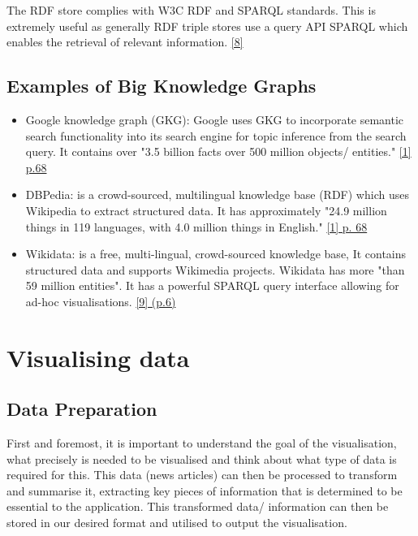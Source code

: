 
The RDF store complies with  W3C RDF and SPARQL standards. This is extremely useful as generally RDF triple stores use a query API SPARQL which enables the retrieval of relevant information. \hyperlink{8}{[8]}

\subsection{Examples of Big Knowledge Graphs}

\begin{itemize}
\item Google knowledge graph (GKG):  Google uses GKG to incorporate semantic search functionality into its search engine for topic inference from the search query. It contains over "3.5
billion facts over 500 million objects/ entities." \hyperlink{1}{[1] p.68}

\item DBPedia: is a crowd-sourced, multilingual knowledge base (RDF) which uses Wikipedia to extract structured data. It has approximately "24.9 million things in 119 languages, with 4.0 million things in English." \hyperlink{1}{[1] p. 68}

\item Wikidata: is a free, multi-lingual, crowd-sourced
knowledge base, It contains structured data and supports Wikimedia projects. Wikidata has more "than 59 million entities". It has a powerful SPARQL query interface allowing for ad-hoc visualisations. \hyperlink{9}{[9] (p.6)}

\end{itemize}


\section{Visualising data}



\subsection{Data Preparation}
First and foremost, it is important to understand the goal of the visualisation, what precisely is needed to be visualised and think about what type of data is required for this. This data (news articles) can then be processed to transform and summarise it, extracting key pieces of information that is determined to be essential to the application. This transformed data/ information can then be stored in our desired format and utilised to output the visualisation. 

